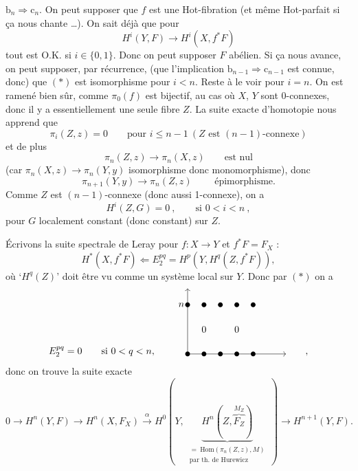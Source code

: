 \documentclass[11pt]{article}
\newcommand{\printedpage}[1]{\marginpar{\footnotesize p.~#1}}
\newcommand{\msp}[1]{\marginpar{\footnotesize [#1]}}
\begin{document}
\printedpage{120}

\msp{page 180}
$\mathrm{b}_n \Longrightarrow \mathrm{c}_n$. On peut supposer que $f$ est une Hot-fibration (et même Hot-parfait si ça nous chante \dots). On sait déjà que pour
\[
H^i(Y,F) \longrightarrow H^i(X,f^*F) \tag*{$(*)$}
\]
tout est O.K. si $i \in \{0,1\}$. Donc on peut supposer $F$ abélien. Si ça nous avance, on peut supposer, par récurrence, (que l’implication $\mathrm{b}_{n-1} \Longrightarrow \mathrm{c}_{n-1}$ est connue, donc) que $(*)$ est isomorphisme pour $i<n$. Reste à le voir pour $i=n$. On est ramené bien sûr, comme $\pi_0(f)$ est bijectif, au cas où $X$, $Y$ sont 0-connexes, donc il y a essentiellement une seule fibre $Z$. La suite exacte d’homotopie nous apprend que
\[
\pi_i(Z,z)=0 \qquad \text{pour } i \le n-1 \ (Z \text{ est } (n-1)\text{-connexe})
\]
et de plus
\[
\pi_n(Z,z) \longrightarrow \pi_n(X,z) \qquad \text{est nul}
\]
(car $\pi_n(X,z) \longrightarrow \pi_n(Y,y)$ isomorphisme donc monomorphisme), donc
\[
\pi_{n+1}(Y,y) \longrightarrow \pi_n(Z,z) \qquad \text{ épimorphisme.}
\]
Comme $Z$ est $(n-1)$-connexe (donc aussi 1-connexe), on a
\[
H^i(Z,G)=0\ , \qquad \text{si } 0<i<n\ , \tag*{$(*)$}
\]
pour $G$ localement constant (donc constant) sur $Z$.

\msp{page 181}
Écrivons la suite spectrale de Leray pour $f : X \longrightarrow Y$ et $f^*F = F_X$ :
\[
H^*(X,f^*F) \Longleftarrow E_2^{pq} = H^p(Y,H^q(Z,f^*F)),
\]
où ‘$H^q(Z)$’ doit être vu comme un système local sur $Y$. Donc par $(*)$ on a
\[
E_2^{pq}=0 \qquad \text{si } 0<q<n, \qquad
\begin{tikzpicture}[baseline=0pt, x=0.6cm, y=0.6cm]
\draw[->] (0,0) -- (0,4);
\draw[->] (0,0) -- (6,0);
\node[left] at (0,3) {$n$};
\foreach \i in {0,...,4} { \fill (\i,3) circle (2.5pt); \fill (\i,0) circle (2.5pt); }
\node at (1,1.5) {$0$};
\node at (3,1.5) {$0$};
\end{tikzpicture}
\qquad ,
\]
donc on trouve la suite exacte
\[
0 \longrightarrow H^n(Y,F) \longrightarrow H^n(X,F_X) \xrightarrow{\ \alpha\ } H^0(Y,\ \underbrace{H^n(Z,\overbrace{F_Z}^{M_Z})}_{\begin{array}{l}\scriptstyle = \ \mathrm{Hom}(\pi_n(Z,z),M)\\ \scriptstyle \text{par th. de Hurewicz}\end{array}}\ ) \longrightarrow H^{n+1}(Y,F).
\]

\printedpage{121}
\end{document}
